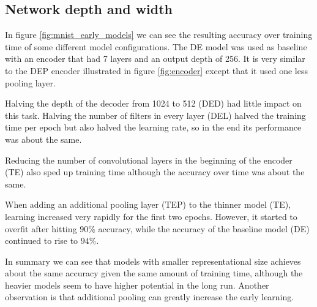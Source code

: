 


\subsection{Network depth and width} \label{sssec:exp_encoder}



In figure \ref{fig:mnist_early_models} we can see the resulting accuracy over training time of some different model configurations. The DE model was used as baseline with an encoder that had 7 layers and an output depth of 256. It is very similar to the DEP encoder illustrated in figure \ref{fig:encoder} except that it used one less pooling layer.

Halving the depth of the decoder from 1024 to 512 (DED) had little impact on this task. Halving the number of filters in every layer (DEL) halved the training time per epoch but also halved the learning rate, so in the end its performance was about the same.


Reducing the number of convolutional layers in the beginning of the encoder (TE) also sped up training time although the accuracy over time was about the same.

When adding an additional pooling layer (TEP) to the thinner model (TE), learning increased very rapidly for the first two epochs. However, it started to overfit after hitting $90\%$ accuracy, while the accuracy of the baseline model (DE) continued to rise to $94\%$.

In summary we can see that models with smaller representational size achieves about the same accuracy given the same amount of training time, although the heavier models seem to have higher potential in the long run. Another observation is that additional pooling can greatly increase the early learning.


